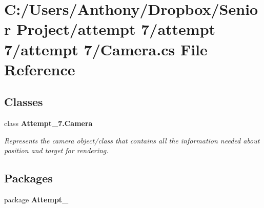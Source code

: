 \section{C:/Users/Anthony/Dropbox/Senior Project/attempt 7/attempt 7/attempt 7/Camera.cs File Reference}
\label{_camera_8cs}
\subsection*{Classes}
\begin{DoxyCompactItemize}
\item 
class {\bf Attempt\_\-7.Camera}
\begin{DoxyCompactList}\small\item\em Represents the camera object/class that contains all the information needed about position and target for rendering. \item\end{DoxyCompactList}\end{DoxyCompactItemize}
\subsection*{Packages}
\begin{DoxyCompactItemize}
\item 
package {\bf Attempt\_}
\end{DoxyCompactItemize}
